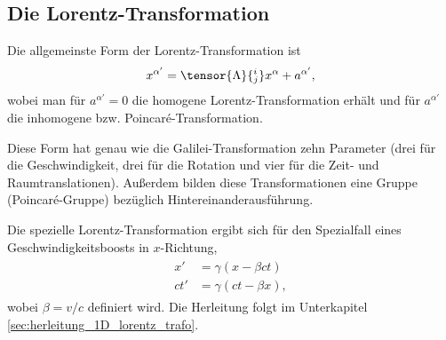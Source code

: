 \subsection{Die Lorentz-Transformation}

Die allgemeinste Form der Lorentz-Transformation ist
\begin{align*}
    x^{\alpha'}=\tensor{\Lambda}{^i_j}x^\alpha+a^{\alpha'},
\end{align*}
wobei man für $a^{\alpha'}=0$ die homogene Lorentz-Transformation erhält und für $a^{\alpha'}$ die inhomogene bzw. Poincaré-Transformation.

Diese Form hat genau wie die Galilei-Transformation zehn Parameter (drei für die Geschwindigkeit, drei für die Rotation und vier für die Zeit- und Raumtranslationen).
Außerdem bilden diese Transformationen eine Gruppe (Poincaré-Gruppe) bezüglich Hintereinanderausführung.

Die spezielle Lorentz-Transformation ergibt sich für den Spezialfall eines Geschwindigkeitsboosts in $x$-Richtung,
\begin{align}
    \label{eq:spezielle_lorentz_trafo}
    \begin{split}
        x'  & = \gamma(x-\beta ct)   \\
        ct' & = \gamma (ct-\beta x),
    \end{split}
\end{align}
wobei $\beta=v/c$ definiert wird. Die Herleitung folgt im Unterkapitel \ref{sec:herleitung_1D_lorentz_trafo}.


